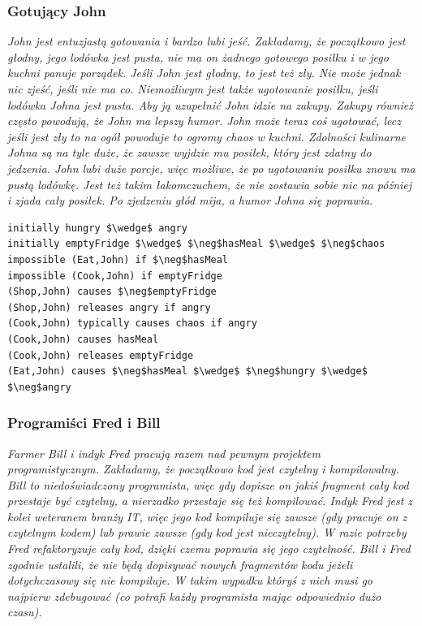 \documentclass{article}
\begin{document}
\subsubsection{Gotujący John}


\textit{John jest entuzjastą gotowania i bardzo lubi jeść. Zakładamy, że początkowo jest głodny, jego lodówka jest pusta, nie ma on żadnego gotowego posiłku i w jego kuchni panuje porządek. Jeśli John jest głodny, to jest też zły. Nie może jednak nic zjeść, jeśli nie ma co. Niemożliwym jest także ugotowanie posiłku, jeśli lodówka Johna jest pusta. Aby ją uzupełnić John idzie na zakupy. Zakupy również często powodują, że John ma lepszy humor. John może teraz coś ugotować, lecz jeśli jest zły to na ogół powoduje to ogromy chaos w kuchni. Zdolności kulinarne Johna są na tyle duże, że zawsze wyjdzie mu posiłek, który jest zdatny do jedzenia. John lubi duże porcje, więc możliwe, że po ugotowaniu posiłku znowu ma pustą lodówkę. Jest też takim łakomczuchem, że nie zostawia sobie nic na później i zjada cały posiłek. Po zjedzeniu głód mija, a humor Johna się poprawia.}

\bigskip
{}
\begin{lstlisting}[mathescape=true]
initially hungry $\wedge$ angry
initially emptyFridge $\wedge$ $\neg$hasMeal $\wedge$ $\neg$chaos 
impossible (Eat,John) if $\neg$hasMeal 
impossible (Cook,John) if emptyFridge
(Shop,John) causes $\neg$emptyFridge
(Shop,John) releases angry if angry
(Cook,John) typically causes chaos if angry
(Cook,John) causes hasMeal 
(Cook,John) releases emptyFridge 
(Eat,John) causes $\neg$hasMeal $\wedge$ $\neg$hungry $\wedge$ $\neg$angry
\end{lstlisting}

\subsubsection{Programiści Fred i Bill}


\textit{Farmer Bill i indyk Fred pracują razem nad pewnym projektem programistycznym. Zakładamy, że początkowo kod jest czytelny i kompilowalny. Bill to niedoświadczony programista, więc gdy dopisze on jakiś fragment cały kod przestaje być czytelny, a nierzadko przestaje się też kompilować. Indyk Fred jest z kolei weteranem branży IT, więc jego kod kompiluje się zawsze (gdy pracuje on z czytelnym kodem) lub prawie zawsze (gdy kod jest nieczytelny). W razie potrzeby Fred refaktoryzuje cały kod, dzięki czemu poprawia się jego czytelność. Bill i Fred zgodnie ustalili, że nie będą dopisywać nowych fragmentów kodu jeżeli dotychczasowy się nie kompiluje. W takim wypadku któryś z nich musi go najpierw zdebugować (co potrafi każdy programista mając odpowiednio dużo czasu).}
\end{document}
